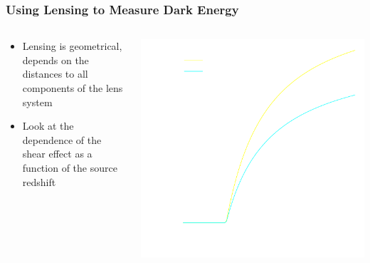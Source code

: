 \documentclass{beamer}
\begin{document}
\frame
{
    \frametitle{Using Lensing to Measure Dark Energy}

    \begin{columns}
        \begin{column}{0.5\textwidth}    
            \begin{itemize}

                \item Lensing is geometrical, depends on the distances to all
                    components of the lens system

                \item Look at the dependence of the shear effect as a function
                    of the source redshift
                    
            \end{itemize}
        \end{column}
        \begin{column}{0.5\textwidth}
            \begin{center}
                \includegraphics[width=\textwidth]{scinv-example-invert.pdf}
            \end{center}
        \end{column}
    \end{columns}
}
\end{document}
